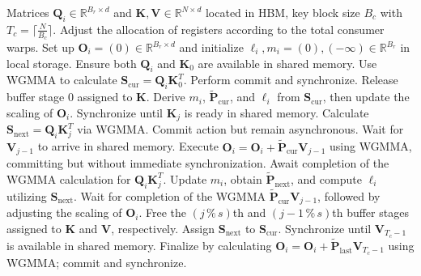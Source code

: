 \begin{enumerate}
\begin{algorithm}[H]
    \caption{\small\label{alg:flash3_wgmma}\textsc{FlashAttention-3} consumer warpgroup forward pass}
    \begin{algorithmic}[1]
      \REQUIRE  Matrices $\mathbf{Q}_i \in \mathbb{R}^{B_r \times d}$ and $\mathbf{K}, \mathbf{V} \in \mathbb{R}^{N \times d}$ located in HBM, key block size $B_c$ with $T_c = \lceil \frac{N}{B_c} \rceil$.
      \STATE Adjust the allocation of registers according to the total consumer warps.
      \STATE Set up $\mathbf{O}_i = (0) \in \mathbb{R}^{B_r \times d}$ and initialize $\ell_i, m_i = (0), (-\infty) \in \mathbb{R}^{B_r}$ in local storage.
      \STATE Ensure both $\mathbf{Q}_i$ and $\mathbf{K}_0$ are available in shared memory.
      \STATE Use WGMMA to calculate $\mathbf{S}_{\mathrm{cur}} = \mathbf{Q}_i \mathbf{K}_0^T$. Perform commit and synchronize.
      \STATE Release buffer stage $0$ assigned to $\mathbf{K}$.
      \STATE Derive $m_{i}$, $\tilde{\mathbf{P}}_{\mathrm{cur}}$, and $\ell_{i}$ from $\mathbf{S}_{\mathrm{cur}}$, then update the scaling of $\mathbf{O}_i$.
        \STATE Synchronize until $\mathbf{K}_j$ is ready in shared memory.
        \label{code:mainloop_start}
        \STATE Calculate $\mathbf{S}_{\mathrm{next}} = \mathbf{Q}_i \mathbf{K}_{j}^T$ via WGMMA. Commit action but remain asynchronous. \label{code:first_wgmma}
        \STATE Wait for $\mathbf{V}_{j-1}$ to arrive in shared memory.
        \STATE Execute $\mathbf{O}_{i} = \mathbf{O}_{i} + \tilde{\mathbf{P}}_{\mathrm{cur}} \mathbf{V}_{j-1}$ using WGMMA, committing but without immediate synchronization. \label{code:second_wgmma}
        \STATE Await completion of the WGMMA calculation for $\mathbf{Q}_i \mathbf{K}_{j}^T$.
        \STATE Update $m_{i}$, obtain $\tilde{\mathbf{P}}_{\mathrm{next}}$, and compute $\ell_{i}$ utilizing $\mathbf{S}_{\mathrm{next}}$. \label{code:softmax}
        \STATE Wait for completion of the WGMMA $\tilde{\mathbf{P}}_{\mathrm{cur}} \mathbf{V}_{j-1}$, followed by adjusting the scaling of $\mathbf{O}_i$.
        \STATE Free the $(j\,\%\,s)$th and $(j-1\,\%\,s)$th buffer stages assigned to $\mathbf{K}$ and $\mathbf{V}$, respectively.
        \STATE Assign $\mathbf{S}_{\mathrm{next}}$ to $\mathbf{S}_{\mathrm{cur}}$.
        \label{code:mainloop_end}
      \ENDFOR
      \STATE Synchronize until $\mathbf{V}_{T_c - 1}$ is available in shared memory.
      \STATE Finalize by calculating 
      $\mathbf{O}_{i} = \mathbf{O}_{i} + \tilde{\mathbf{P}}_{\mathrm{last}} \mathbf{V}_{T_c - 1}$ using WGMMA; commit and synchronize.


\end{algorithmic}
\end{algorithm}
\end{enumerate}
